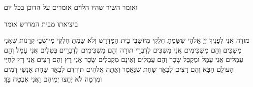     {\centering
    {\scriptsize    ואומר השיר שהיו הלוים אומרים על הדוכן בכל יום}
    
      \larger ביציאתו מבית המדרש אומר

    }

\begin{tp}{74}
    מוֹדֶה אֲנִי לְפָנֶיךָ יְיָ אֱלֹהַי שֶׁשַּׂמְתָּ חֶלְקִי מִיּוֹשְׁבֵי בֵית הַמֶּדְרָשׁ וְלֹא שַמְתָּ חֶלְקִי מִיּוֹשְׁבֵי קְרָנוֹת
    שֶׁאֲנִי מַשְׁכִּים וְהֵם מַשְׁכִּימִים אֲנִי מַשְׁכִּים לְדִבְרֵי תוֹרָה וְהֵם מַשְׁכִּימִים לִדְבָרֵים בְּטֵלִים 
    אֲנִי עָמֵל וְהֵם עֲמֵלִים אֲנִי עָמֵל וּמְקַבֵּל שָׂכָר וְהֵם עֲמֵלִים וְאֵינָם מְקַבְּלִים שָׂכָר
    אֲנִי רָץ וְהֵם רָצִים אֲנִי רָץ לְחַיֵּי הָעוֹלָם הַבָּא וְהֵם רָצִים לִבְאֵר שַׁחַת\hdot
    שֶׁנֶּאֱמֶר וְאַתָּה אֱלֹהִים תּוֹרִדֵם לִבְאֵר שַׁחַת אַנְשֵׁי דָמִים וּמִרְמָה לֹא יֶחֱצוּ יְמֵיהֶם וַאֲנִי אֶבְטַח בָּךְ׃
\end{tp}

